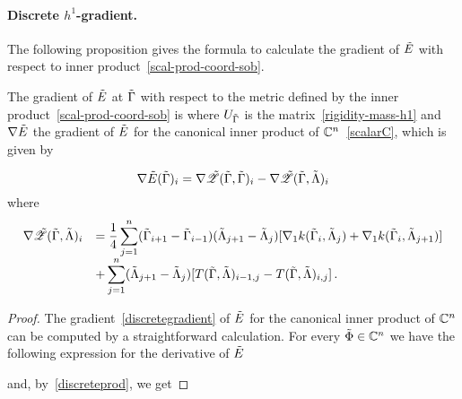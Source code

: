 \paragraph{Discrete $h^1$-gradient. }

The following proposition gives the formula to calculate the gradient of $\tilde{E}$ with respect to inner product~\eqref{scal-prod-coord-sob}.
\begin{prop}
The gradient of $\tilde{E}$ at $\tilde{\Gamma}$ with respect to the metric defined by the  inner product~\eqref{scal-prod-coord-sob} is
where $U_{\tilde{\Gamma}}$ is the  matrix~\eqref{rigidity-mass-h1} and $\nabla \tilde{E}$ the  gradient of $\tilde{E}$ for the canonical inner product of $\mathbb{C}^{n}$~\eqref{scalarC}, which is given by

\begin{equation}\label{discretegradient}
\nabla \tilde{E}(\tilde{\Gamma})_i = \nabla \tilde{\mathcal{Z}}(\tilde{\Gamma}, \tilde{\Gamma})_i -\nabla \tilde{\mathcal{Z}}(\tilde{\Gamma}, \tilde{\Lambda})_i
\end{equation}
where 
$$
\begin{array}{ll}
 \nabla \tilde{\mathcal{Z}}(\tilde{\Gamma}, \tilde{\Lambda})_i &\displaystyle{ = 
 	\frac{1}{4} \sum_{j=1}^n  (\tilde{\Gamma}_{i+1}-\tilde{\Gamma}_{i-1}) (\tilde{\Lambda}_{j+1}-\tilde{\Lambda}_j)[\nabla_1 k(\tilde{\Gamma}_i,\tilde{\Lambda}_j)+ \nabla_1 k(\tilde{\Gamma}_i,\tilde{\Lambda}_{j+1})]} \\
		& \displaystyle{+ \sum_{j=1}^n  (\tilde{\Lambda}_{j+1}-\tilde{\Lambda}_j)[ T(\tilde{\Gamma},\tilde{\Lambda})_{i-1,j} - T(\tilde{\Gamma},\tilde{\Lambda})_{i,j} ]}\,.
		\end{array}
		$$

\end{prop}

\begin{proof}
The  gradient~\eqref{discretegradient} of $\tilde{E}$ for the canonical inner product of $\mathbb{C}^{n}$  can be computed by a straightforward calculation. For every $\tilde{\Phi}\in  \mathbb{C}^n$ we have the following expression for the derivative of $\tilde{E}$

and, by~\eqref{discreteprod}, we get 
\end{proof}


